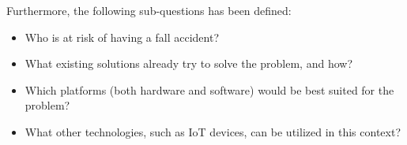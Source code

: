Furthermore, the following sub-questions has been defined:
\begin{itemize}
    \item Who is at risk of having a fall accident?
    \item What existing solutions already try to solve the problem, and how?
    \item Which platforms (both hardware and software) would be best suited for the problem?
    \item What other technologies, such as IoT devices, can be utilized in this context?
\end{itemize}